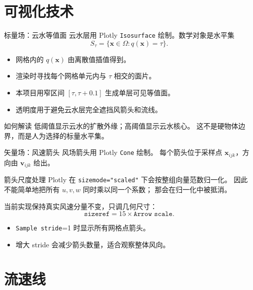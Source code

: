 \documentclass[aspectratio=169,11pt]{ctexbeamer}
\newcommand{\vx}{\mathbf x}
\newcommand{\vv}{\mathbf v}
\begin{document}
\section{可视化技术}

\begin{frame}{标量场：云水等值面}
  \small
  云水层用 Plotly \texttt{Isosurface} 绘制。数学对象是水平集
  \[
    S_\tau = \{\vx\in\Omega:q(\vx)=\tau\}.
  \]

  \begin{itemize}
    \item 网格内的 $q(\vx)$ 由离散值插值得到。
    \item 渲染时寻找每个网格单元内与 $\tau$ 相交的面片。
    \item 本项目用窄区间 $[\tau,\tau+0.1]$ 生成单层可见等值面。
    \item 透明度用于避免云水层完全遮挡风箭头和流线。
  \end{itemize}

  \begin{block}{如何解读}
    低阈值显示云水的扩散外缘；高阈值显示云水核心。
    这不是硬物体边界，而是人为选择的标量水平集。
  \end{block}
\end{frame}

\begin{frame}{矢量场：风速箭头}
  \small
  风场箭头用 Plotly \texttt{Cone} 绘制。
  每个箭头位于采样点 $\vx_{ijk}$，方向由 $\vv_{ijk}$ 给出。

  \begin{block}{箭头尺度处理}
    Plotly 在 \texttt{sizemode="scaled"} 下会按整组向量范数归一化。
    因此不能简单地把所有 $u,v,w$ 同时乘以同一个系数；
    那会在归一化中被抵消。

    当前实现保持真实风速分量不变，只调几何尺寸：
    \[
      \texttt{sizeref}=15\times \texttt{Arrow scale}.
    \]
  \end{block}

  \begin{itemize}
    \item \texttt{Sample stride}=1 时显示所有网格点箭头。
    \item 增大 stride 会减少箭头数量，适合观察整体风向。
  \end{itemize}
\end{frame}

\section{流速线}
\end{document}
